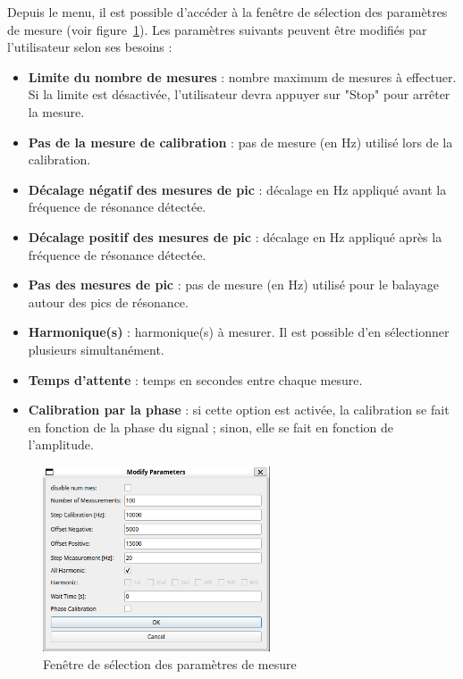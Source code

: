 Depuis le menu, il est possible d'accéder à la fenêtre de sélection des paramètres de mesure (voir figure~\ref{fig:paramerter window}).  
Les paramètres suivants peuvent être modifiés par l'utilisateur selon ses besoins :

\begin{itemize}[label=\textbullet]
    \item \textbf{Limite du nombre de mesures} : nombre maximum de mesures à effectuer. Si la limite est désactivée, l'utilisateur devra appuyer sur "Stop" pour arrêter la mesure.
    
    \item \textbf{Pas de la mesure de calibration} : pas de mesure (en Hz) utilisé lors de la calibration.
    
    \item \textbf{Décalage négatif des mesures de pic} : décalage en Hz appliqué avant la fréquence de résonance détectée.
    
    \item \textbf{Décalage positif des mesures de pic} : décalage en Hz appliqué après la fréquence de résonance détectée.
    
    \item \textbf{Pas des mesures de pic} : pas de mesure (en Hz) utilisé pour le balayage autour des pics de résonance.
    
    \item \textbf{Harmonique(s)} : harmonique(s) à mesurer. Il est possible d'en sélectionner plusieurs simultanément.
    
    \item \textbf{Temps d'attente} : temps en secondes entre chaque mesure.
    
    \item \textbf{Calibration par la phase} : si cette option est activée, la calibration se fait en fonction de la phase du signal ; sinon, elle se fait en fonction de l'amplitude.
\end{itemize}

\begin{figure}[H]
    \centering
    \includegraphics[width=0.6\textwidth]{assets/figures/Parameter_window.png}
    \caption{Fenêtre de sélection des paramètres de mesure}
    \label{fig:paramerter window}
\end{figure}

